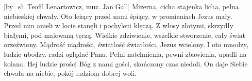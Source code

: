 [by={sł. Teofil Lenartowicz, muz. Jan Gall}]
\beginverse
Mizerna, cicha stajenka licha,
pełna niebieskiej chwały.
Oto leżący przed nami śpiący,
w promieniach Jezus mały.
\endverse
\beginverse
Przed nim anieli w locie stanęli
i pochyleni klęczą.
Z włosy złotymi, skrzydły białymi,
pod malowaną tęczą.
\endverse
\beginverse
Wielkie zdziwienie, wszelkie stworzenie,
cały świat orzeźwiony.
Mądrość mądrości, światłość światłości,
Jezus wcielony.
\endverse
\beginverse
I oto mnodzy, ludzie ubodzy,
radzi oglądać Pana.
Pełni natchnienia, pewni zbawienia,
upadli na kolana.
\endverse
\beginverse
Hej ludzie prości Bóg z nami gości,
skończony czas niedoli.
On daje Siebie chwała na niebie,
pokój ludziom dobrej woli.
\endverse
\endsong